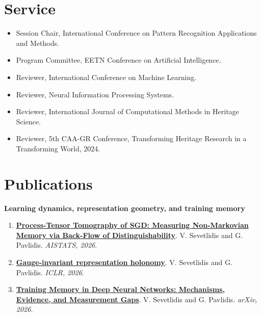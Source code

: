 \documentclass[11pt,a4paper]{article}
\newcommand{\cvsection}[1]{\section*{#1}}
\newcommand{\paper}[4]{%
  \item \textbf{\href{#4}{#1}}. #2. \textit{#3}.
}
\begin{document}
\cvsection{Service}
\begin{itemize}
  \item Session Chair, International Conference on Pattern Recognition Applications and Methods.
  \item Program Committee, EETN Conference on Artificial Intelligence.
  \item Reviewer, International Conference on Machine Learning.
  \item Reviewer, Neural Information Processing Systems.
  \item Reviewer, International Journal of Computational Methods in Heritage Science.
  \item Reviewer, 5th CAA-GR Conference, Transforming Heritage Research in a Transforming World, 2024.
\end{itemize}

\cvsection{Publications}
\textbf{Learning dynamics, representation geometry, and training memory}
\begin{enumerate}
  \paper{Process-Tensor Tomography of SGD: Measuring Non-Markovian Memory via Back-Flow of Distinguishability}{V. Sevetlidis and G. Pavlidis}{AISTATS, 2026}{https://openreview.net/forum?id=TonOzlbE3k}
  \paper{Gauge-invariant representation holonomy}{V. Sevetlidis and G. Pavlidis}{ICLR, 2026}{https://openreview.net/forum?id=czJqKToDGq}
  \paper{Training Memory in Deep Neural Networks: Mechanisms, Evidence, and Measurement Gaps}{V. Sevetlidis and G. Pavlidis}{arXiv, 2026}{https://arxiv.org/abs/2601.21624}
\end{enumerate}
\end{document}
